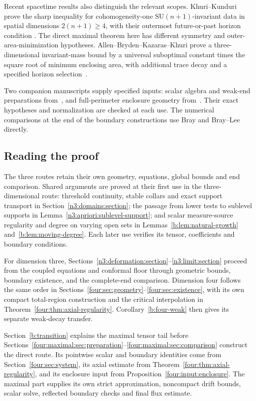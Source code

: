 Recent spacetime results also distinguish the relevant scopes.
Khuri--Kunduri prove the sharp inequality for cohomogeneity-one
$\mathrm{SU}(n+1)$-invariant data in spatial dimensions $2(n+1)\ge4$,
with their outermost future-or-past horizon condition
\cite[Theorem~1.1]{KhuriKunduri2025}.  The direct maximal theorem here
has different symmetry and outer-area-minimization hypotheses.
Allen--Bryden--Kazaras--Khuri prove a three-dimensional invariant-mass
bound by a universal suboptimal constant times the square root of
minimum enclosing area, with additional trace decay and a specified
horizon selection~\cite[Theorem~1.1 and Remark~1.2]{AllenBrydenKazarasKhuri2025}.

Two companion manuscripts supply specified inputs: scalar algebra and
weak-end preparations from~\cite{NumericalCompanion}, and full-perimeter
enclosure geometry from~\cite{RiemannianCompanion}. Their exact hypotheses
and normalization are checked at each use. The numerical comparisons
at the end of the boundary constructions use Bray and Bray--Lee directly.

\subsection{Reading the proof}

The three routes retain their own geometry, equations, global bounds and
end comparison. Shared arguments are proved at their first use in the
three-dimensional route: threshold continuity, stable collars and exact
support transport in Section~\ref{n3:domains:section}; the passage from
lower tests to sublevel supports in Lemma~\ref{n3:apriori:sublevel-support};
and scalar measure-source regularity and degree on varying open sets in
Lemmas~\ref{b:lem:natural-growth} and~\ref{b:lem:moving-degree}.
Each later use verifies its tensor, coefficients and boundary conditions.

For dimension three, Sections~\ref{n3:deformation:section}--\ref{n3:limit:section}
proceed from the coupled equations and conformal floor through geometric
bounds, boundary existence, and the complete-end comparison. Dimension
four follows the same order in
Sections~\ref{four:sec:geometry}--\ref{four:sec:existence}, with its own
compact total-region construction and the critical interpolation in
Theorem~\ref{four:thm:axial-regularity}. Corollary~\ref{b:four-weak}
then gives its separate weak-decay transfer.

Section~\ref{b:transition} explains the maximal tensor tail before
Sections~\ref{four:maximal:sec:preparation}--\ref{four:maximal:sec:comparison}
construct the direct route. Its pointwise scalar and boundary identities
come from Section~\ref{four:sec:system}, its axial estimate from
Theorem~\ref{four:thm:axial-regularity}, and its enclosure input from
Proposition~\ref{four:input:enclosure}. The maximal part supplies its own
strict approximation, noncompact drift bounds, scalar solve, reflected
boundary checks and final flux estimate.
